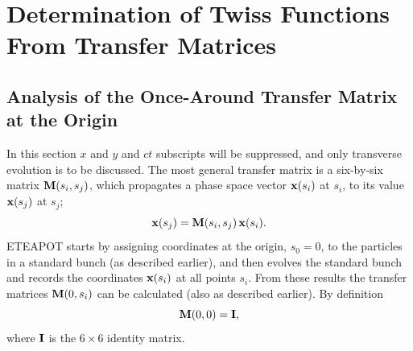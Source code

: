 \documentclass[]{article}
\begin{document}
\section{Determination of Twiss Functions From Transfer Matrices}
\subsection{Analysis of the Once-Around Transfer Matrix at the Origin}
In this section $x$ and $y$ and $ct$ subscripts will be suppressed,
and only transverse evolution is to be discussed. 
The most general
transfer matrix is a six-by-six matrix ${\bf M}(s_i,s_j)$, which propagates a
phase space vector ${\bf x}(s_i)$ at $s_i$, to its value ${\bf x}(s_j)$ at $s_j$;
%
\begin{equation}
{\bf x}(s_j) 
 =
{\bf M}(s_i,s_j)\,
{\bf x}(s_i). 
\label{TM.1}
\end{equation}
%
ETEAPOT starts by assigning coordinates at the origin, $s_0=0$,
to the particles in a standard bunch (as described earlier), and then
evolves the standard bunch and records the coordinates ${\bf x}(s_i)$ 
at all points $s_i$.  From these results the transfer matrices 
${\bf M}(0,s_i)$ can be calculated (also as described earlier). By definition
%
\begin{equation}
{\bf M}(0,0)
 =
{\bf I}, 
\label{TM.2}
\end{equation}
%
where ${\bf I}$ is the $6\times6$ identity matrix. 
\end{document}
